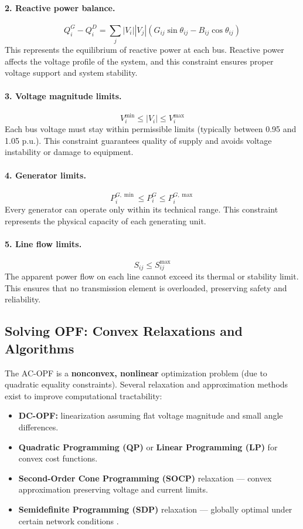 \documentclass[11pt]{article}
\begin{document}
	\paragraph{2. Reactive power balance.}
	\[
	Q_i^{G} - Q_i^{D} = \sum_{j} |V_i||V_j|(G_{ij}\sin\theta_{ij} - B_{ij}\cos\theta_{ij})
	\]
	This represents the equilibrium of reactive power at each bus. Reactive power affects the voltage profile of the system, and this constraint ensures proper voltage support and system stability.
	
	\paragraph{3. Voltage magnitude limits.}
	\[
	V_i^{\min} \le |V_i| \le V_i^{\max}
	\]
	Each bus voltage must stay within permissible limits (typically between 0.95 and 1.05 p.u.). This constraint guarantees quality of supply and avoids voltage instability or damage to equipment.
	
	\paragraph{4. Generator limits.}
	\[
	P_i^{G,\min} \le P_i^{G} \le P_i^{G,\max}
	\]
	Every generator can operate only within its technical range. This constraint represents the physical capacity of each generating unit.
	
	\paragraph{5. Line flow limits.}
	\[
	S_{ij} \le S_{ij}^{\max}
	\]
	The apparent power flow on each line cannot exceed its thermal or stability limit. This ensures that no transmission element is overloaded, preserving safety and reliability.
	
	\subsection{Solving OPF: Convex Relaxations and Algorithms}
	
	The AC-OPF is a \textbf{nonconvex, nonlinear} optimization problem (due to quadratic equality constraints).  
	Several relaxation and approximation methods exist to improve computational tractability:
	
	\begin{itemize}
		\item \textbf{DC-OPF:} linearization assuming flat voltage magnitude and small angle differences.
		\item \textbf{Quadratic Programming (QP)} or \textbf{Linear Programming (LP)} for convex cost functions.
		\item \textbf{Second-Order Cone Programming (SOCP)} relaxation — convex approximation preserving voltage and current limits.
		\item \textbf{Semidefinite Programming (SDP)} relaxation — globally optimal under certain network conditions \cite{lavaei2012zero}.
	\end{itemize}
	
\end{document}
